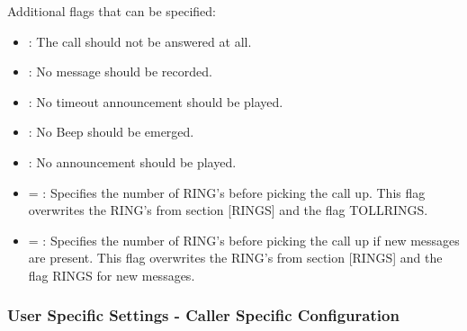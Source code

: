\begin{description}
    Additional flags that can be specified:
    \begin{itemize}
        \item {}: The call should not be answered at all.
        \item {}: No message should be recorded.
        \item {}: No timeout announcement should be played.
        \item {}: No Beep should be emerged.
        \item {}: No announcement should be played.
        \item {}= : Specifies the number of RING's before picking the call up. 
            This flag overwrites the RING's from section [RINGS] and the flag TOLLRINGS.
        \item {}= : Specifies the number of RING's before picking the call up 
            if new messages are present. This flag overwrites the RING's from section
            [RINGS] and the flag RINGS for new messages.
    \end{itemize}
\end{description}

\subsubsection{User Specific Settings - Caller Specific Configuration}

